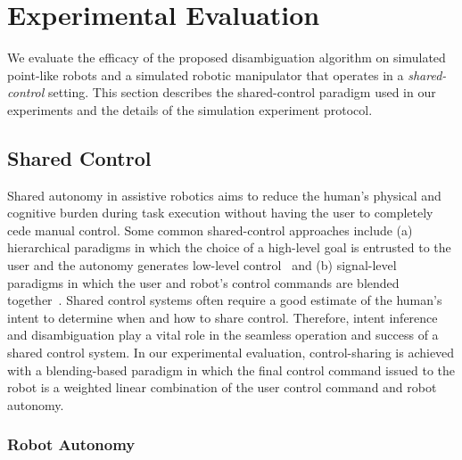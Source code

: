 \documentclass[conference]{IEEEtran}
\begin{document}
\section{Experimental Evaluation}\label{sec:ed}
We evaluate the efficacy of the proposed disambiguation algorithm on simulated point-like robots and a simulated robotic manipulator that operates in a \textit{shared-control} setting. This section describes the shared-control paradigm used in our experiments and the details of the simulation experiment protocol.
\subsection{Shared Control}\label{ssec:shared-control}
Shared autonomy in assistive robotics aims to reduce the human's physical and cognitive burden during task execution without having the user to completely cede manual control. Some common shared-control approaches include (a) hierarchical paradigms in which the choice of a high-level goal is entrusted to the user and the autonomy generates low-level control~\citep{kim2012autonomy} and (b) signal-level paradigms in which the user and robot's control commands are blended together~\citep{muelling2017autonomy}. Shared control systems often require a good estimate of the human's intent to determine when and how to share control. Therefore, intent inference and disambiguation play a vital role in the seamless operation and success of a shared control system. In our experimental evaluation, control-sharing is achieved with a blending-based paradigm in which the final control command issued to the robot is a weighted linear combination of the user control command and robot autonomy.
\subsubsection{Robot Autonomy}\label{sssec:autonomy}
\end{document}
